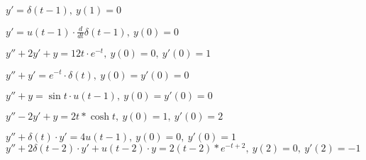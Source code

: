 	\begin{enumtasks}

		\item \( y' = \delta(t-1), ~ y(1) = 0 \)								%
		\item \( y' = u(t-1) \cdot \frac{d}{dt} \delta(t-1), ~ y(0) = 0 \)		%
		\item \( y'' + 2y' + y = 12t \cdot e^{-t}, ~ y(0) = 0, ~ y'(0) = 1 \)	%
		\item \( y'' + y' = e^{-t} \cdot \delta(t), ~ y(0) = y'(0) = 0 \)		%
		\item \( y'' + y = \sin{t} \cdot u(t-1), ~ y(0) = y'(0) = 0 \)			%
		\item \( y'' - 2y' + y = 2t * \cosh{t}, ~ y(0) = 1, ~ y'(0) = 2 \)		%
		\item \( y'' + \delta(t) \cdot y' = 4u(t-1), ~ y(0) = 0, ~ y'(0) = 1 \)	%
		\itemstar \( y'' + 2\delta(t-2) \cdot y' + u(t-2) \cdot y = 2(t-2) * e^{-t+2}, ~ y(2) = 0, ~ y'(2) = -1 \)	%

	\end{enumtasks}